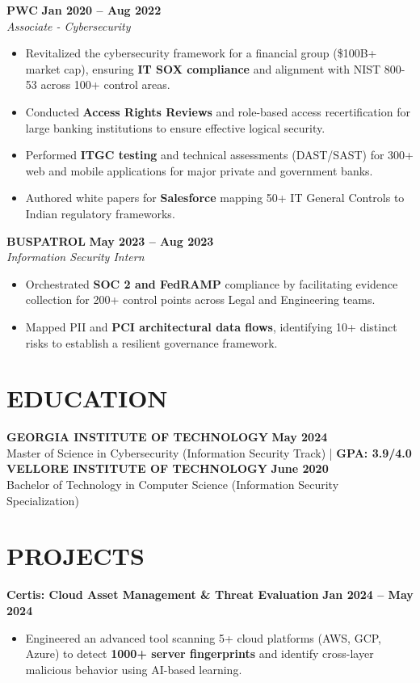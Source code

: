 \documentclass[10pt, letterpaper]{article}
\begin{document}
\textbf{PWC} \hfill \textbf{Jan 2020 -- Aug 2022} \\
\textit{Associate - Cybersecurity} \hfill \textbf{}
\begin{itemize}
    \item Revitalized the cybersecurity framework for a financial group (\$100B+ market cap), ensuring \textbf{IT SOX compliance} and alignment with NIST 800-53 across 100+ control areas.
    \item Conducted \textbf{Access Rights Reviews} and role-based access recertification for large banking institutions to ensure effective logical security.
    \item Performed \textbf{ITGC testing} and technical assessments (DAST/SAST) for 300+ web and mobile applications for major private and government banks.
    \item Authored white papers for \textbf{Salesforce} mapping 50+ IT General Controls to Indian regulatory frameworks.
\end{itemize}

\textbf{BUSPATROL} \hfill \textbf{May 2023 -- Aug 2023} \\
\textit{Information Security Intern} \hfill \textbf{}
\begin{itemize}
    \item Orchestrated \textbf{SOC 2 and FedRAMP} compliance by facilitating evidence collection for 200+ control points across Legal and Engineering teams.
    \item Mapped PII and \textbf{PCI architectural data flows}, identifying 10+ distinct risks to establish a resilient governance framework.
\end{itemize}

\section{EDUCATION}
\textbf{GEORGIA INSTITUTE OF TECHNOLOGY} \hfill \textbf{May 2024} \\
Master of Science in Cybersecurity (Information Security Track) | \textbf{GPA: 3.9/4.0} \\
\textbf{VELLORE INSTITUTE OF TECHNOLOGY} \hfill \textbf{June 2020} \\
Bachelor of Technology in Computer Science (Information Security Specialization)

\section{PROJECTS}
\textbf{Certis: Cloud Asset Management \& Threat Evaluation} \hfill \textbf{Jan 2024 -- May 2024} \\
\begin{itemize}
    \item Engineered an advanced tool scanning 5+ cloud platforms (AWS, GCP, Azure) to detect \textbf{1000+ server fingerprints} and identify cross-layer malicious behavior using AI-based learning.
\end{itemize}
\end{document}
